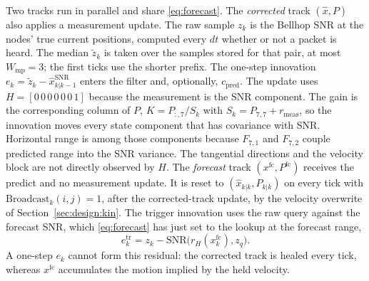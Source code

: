 Two tracks run in parallel and share \eqref{eq:forecast}.
The \emph{corrected} track $(\hat{x},P)$ also applies a measurement
update.
The raw sample $z_k$ is the Bellhop SNR at the nodes' true current
positions, computed every $dt$ whether or not a packet is heard.
The median $\tilde{z}_k$ is taken over the samples stored for that
pair, at most $W_{\mathrm{mp}}=3$; the first ticks use the shorter
prefix.
The one-step innovation
$e_k=\tilde{z}_k-\hat{x}^{\mathrm{SNR}}_{k|k-1}$
enters the filter and, optionally, $c_{\mathrm{pred}}$.
The update uses $H=[0\,0\,0\,0\,0\,0\,1]$ because the measurement
is the SNR component.
The gain is the corresponding column of $P$,
$K=P_{:,7}/S_k$ with $S_k=P_{7,7}+r_{\mathrm{meas}}$, so the
innovation moves every state component that has covariance with SNR.
Horizontal range is among those components because $F_{7,1}$ and
$F_{7,2}$ couple predicted range into the SNR variance.
The tangential directions and the velocity block are not directly
observed by $H$.
The \emph{forecast} track $(x^{\mathrm{fc}},P^{\mathrm{fc}})$
receives the predict and no measurement update.
It is reset to $(\hat{x}_{k|k},P_{k|k})$ on every tick with
$\mathrm{Broadcast}_k(i,j)=1$, after the corrected-track update,
by the velocity overwrite of Section~\ref{sec:design:kin}.
The trigger innovation uses the raw query against the forecast SNR,
which \eqref{eq:forecast} has just set to the lookup at the
forecast range,
\begin{equation}
\label{eq:etrigger}
e_k^{\mathrm{tr}}
= z_k - \mathrm{SNR}\bigl(r_H(x^{\mathrm{fc}}_k),z_q\bigr).
\end{equation}
A one-step $e_k$ cannot form this residual: the corrected track is
healed every tick, whereas $x^{\mathrm{fc}}$ accumulates the motion
implied by the held velocity.

